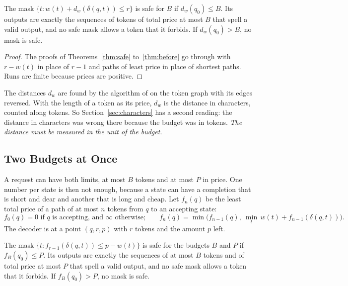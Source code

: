 \documentclass[acmsmall,nonacm,screen]{acmart}
\newcommand{\far}{d}
\begin{document}
\begin{theorem}\label{thm:priced}
The mask $\{t : w(t) + \far_w(\delta(q, t)) \le r\}$ is safe for $B$ if $\far_w(q_0) \le B$.
Its outputs are exactly the sequences of tokens of total price at most $B$ that spell a valid
output, and no safe mask allows a token that it forbids. If $\far_w(q_0) > B$, no mask is
safe.
\end{theorem}

\begin{proof}
The proofs of Theorems~\ref{thm:safe} to~\ref{thm:before} go through with $r - w(t)$ in place
of $r - 1$ and paths of least price in place of shortest paths. Runs are finite because
prices are positive.
\end{proof}

The distances $\far_w$ are found by the algorithm of \citet{Dijkstra1959} on the token graph
with its edges reversed. With the length of a token as its price, $\far_w$ is the distance
in characters, counted along tokens. So Section~\ref{sec:characters} has a second reading:
the distance in characters was wrong there because the budget was in tokens. \emph{The
distance must be measured in the unit of the budget.}

\subsection{Two Budgets at Once}

A request can have both limits, at most $B$ tokens and at most $P$ in price. One number per
state is then not enough, because a state can have a completion that is short and dear and
another that is long and cheap. Let $f_n(q)$ be the least total price of a path of at most
$n$ tokens from $q$ to an accepting state:
\[
  f_0(q) = 0 \text{ if $q$ is accepting, and } \infty \text{ otherwise;} \qquad
  f_n(q) = \min\bigl(f_{n-1}(q),\ \min_{t}\, w(t) + f_{n-1}(\delta(q, t))\bigr).
\]
The decoder is at a point $(q, r, p)$ with $r$ tokens and the amount $p$ left.

\begin{theorem}\label{thm:two}
The mask $\{t : f_{r-1}(\delta(q, t)) \le p - w(t)\}$ is safe for the budgets $B$ and $P$ if
$f_B(q_0) \le P$. Its outputs are exactly the sequences of at most $B$ tokens and of total
price at most $P$ that spell a valid output, and no safe mask allows a token that it
forbids. If $f_B(q_0) > P$, no mask is safe.
\end{theorem}
\end{document}
